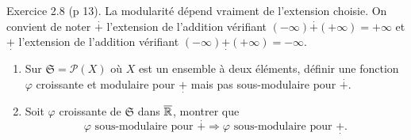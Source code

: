   \noindent Exercice 2.8 (p 13). La modularité dépend vraiment de l'extension choisie.\newline
  On convient de noter $\overset{.}{+}$ l'extension de l'addition vérifiant $(-\infty) \overset{.}{+} (+\infty) = +\infty$ et $\underset{.}{+}$ l'extension de l'addition vérifiant $(-\infty) \underset{.}{+} (+\infty) = -\infty$.
  \begin{enumerate}
    \item Sur $\mathfrak{S} = \mathcal{P}(X)$ où $X$ est un ensemble à deux éléments, définir une fonction $\varphi$ croissante et modulaire pour $\underset{.}{+}$ mais pas sous-modulaire pour $\overset{.}{+}$.
    \item Soit $\varphi$ croissante de $\mathfrak{S}$ dans $\overline{\mathbb{R}}$, montrer que
\begin{displaymath}
  \varphi \text{ sous-modulaire pour } \overset{.}{+} \Rightarrow \varphi \text{ sous-modulaire pour } \underset{.}{+}.
\end{displaymath}
  \end{enumerate}
